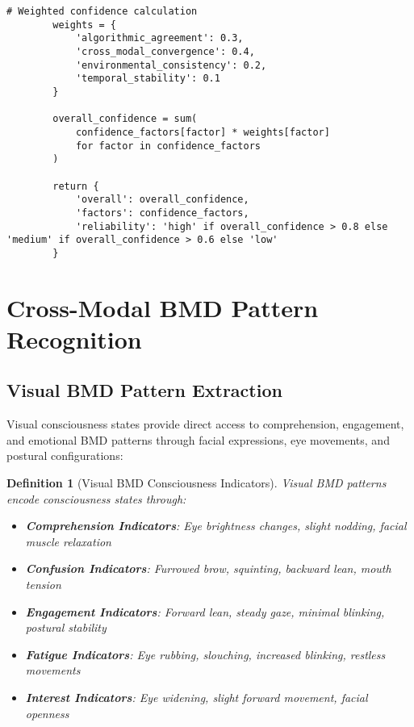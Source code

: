 \documentclass[12pt,a4paper]{article}
\newtheorem{definition}[theorem]{Definition}
\begin{document}
\begin{lstlisting}[style=pythonstyle, caption=Complete CBVD Integration]
        # Weighted confidence calculation
        weights = {
            'algorithmic_agreement': 0.3,
            'cross_modal_convergence': 0.4,
            'environmental_consistency': 0.2,
            'temporal_stability': 0.1
        }
        
        overall_confidence = sum(
            confidence_factors[factor] * weights[factor] 
            for factor in confidence_factors
        )
        
        return {
            'overall': overall_confidence,
            'factors': confidence_factors,
            'reliability': 'high' if overall_confidence > 0.8 else 'medium' if overall_confidence > 0.6 else 'low'
        }
\end{lstlisting}

\section{Cross-Modal BMD Pattern Recognition}

\subsection{Visual BMD Pattern Extraction}

Visual consciousness states provide direct access to comprehension, engagement, and emotional BMD patterns through facial expressions, eye movements, and postural configurations:

\begin{definition}[Visual BMD Consciousness Indicators]
Visual BMD patterns encode consciousness states through:
\begin{itemize}
\item \textbf{Comprehension Indicators}: Eye brightness changes, slight nodding, facial muscle relaxation
\item \textbf{Confusion Indicators}: Furrowed brow, squinting, backward lean, mouth tension
\item \textbf{Engagement Indicators}: Forward lean, steady gaze, minimal blinking, postural stability
\item \textbf{Fatigue Indicators}: Eye rubbing, slouching, increased blinking, restless movements
\item \textbf{Interest Indicators}: Eye widening, slight forward movement, facial openness
\end{itemize}
\end{definition}
\end{document}

